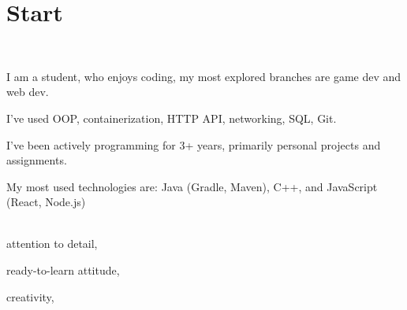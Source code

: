 \documentclass[pastel]{simplehipstercv}
\begin{document}
\pagestyle{empty}

\section*{Start}


\vspace{6em}

\setlength{\columnsep}{1cm}
\begin{paracol}{2}

    \footnotesize

    \flushleft

    \bigskip


    \bigskip


    \bigskip

    \\[0.5em]

    {\footnotesize
    I am a student, who enjoys coding, my most explored branches are game dev and web dev.

    I've used OOP, containerization, HTTP API, networking, SQL, Git.

    I've been actively programming for 3+ years, primarily personal projects and assignments.

    My most used technologies are: Java (Gradle, Maven), C++, and JavaScript (React, Node.js)
    }

    \bigskip

    \\[0.5em]
    attention to detail,

    ready-to-learn attitude,

    creativity,


\end{paracol}
\end{document}

